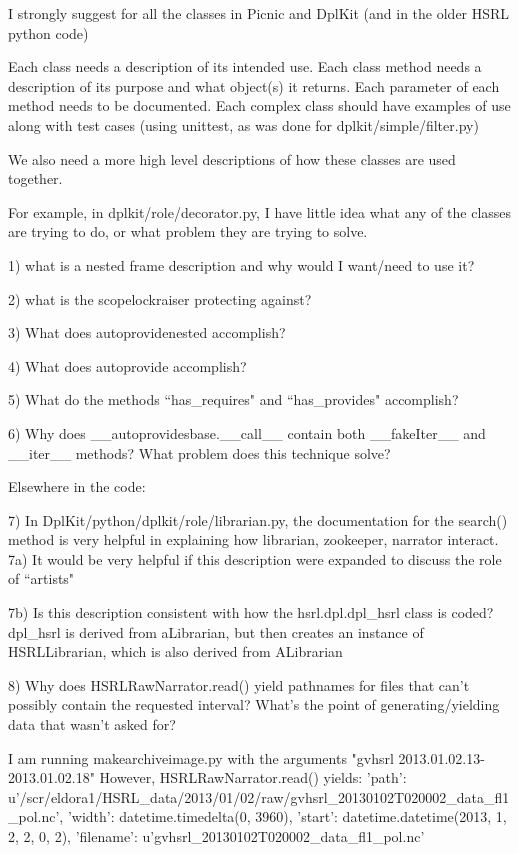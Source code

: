 I strongly suggest for all the classes in Picnic and DplKit (and in the older HSRL python code)

       Each class needs a description of its intended use.
       Each class method needs a description of its purpose and what object(s) it returns.
       Each parameter of each method needs to be documented.
       Each complex class should have examples of use along with test cases (using unittest, as was done for dplkit/simple/filter.py)

We also need a more high level descriptions of how these classes are used together.


 For example, in dplkit/role/decorator.py, I have little idea what any of the classes are trying to do, or what problem they are trying to solve.

 1) what is a nested frame description and why would I want/need to use it?

 2) what is the scopelockraiser protecting against?

 3) What does autoprovidenested accomplish?

 4) What does autoprovide accomplish?

 5) What do the methods “has\_requires" and “has\_provides" accomplish?

 6) Why does \_\_autoprovidesbase.\_\_call\_\_ contain both \_\_fakeIter\_\_ and \_\_iter\_\_ methods?
 What problem does this technique solve?


 Elsewhere in the code:

 7) In  DplKit/python/dplkit/role/librarian.py, the documentation for the search() method is very helpful in explaining how librarian, zookeeper, narrator interact.
 7a) It would be very helpful if this description were expanded to discuss the role of “artists"

 7b) Is this description consistent with how the hsrl.dpl.dpl\_hsrl class is coded?  dpl\_hsrl is derived from aLibrarian, but then creates an instance of HSRLLibrarian, which is also derived from ALibrarian

 8)  Why does
 HSRLRawNarrator.read() yield pathnames for files that can't possibly contain the requested interval?
 What's the point of generating/yielding data that wasn't asked for?

 I am running makearchiveimage.py with the arguments "gvhsrl 2013.01.02.13-2013.01.02.18"
 However, HSRLRawNarrator.read() yields:
 {'path': u'/scr/eldora1/HSRL\_data/2013/01/02/raw/gvhsrl\_20130102T020002\_data\_fl1\_pol.nc', 'width': datetime.timedelta(0, 3960), 'start': datetime.datetime(2013, 1, 2, 2, 0, 2), 'filename': u'gvhsrl\_20130102T020002\_data\_fl1\_pol.nc’}

